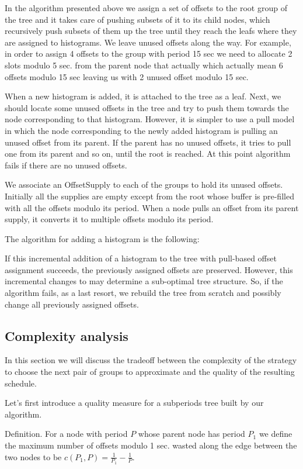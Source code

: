 In the algorithm presented above we assign a set of offsets to the root group of the tree and it takes care of pushing subsets of it to its child nodes, which recursively push subsets of them up the tree until they reach the leafs where they are assigned to histograms. We leave unused offsets along the way. For example, in order to assign 4 offsets to the group with period 15 sec we need to allocate 2 slots modulo 5 sec. from the parent node that actually which actually mean 6 offsets modulo 15 sec leaving us with 2 unused offset modulo 15 sec.

When a new histogram is added, it is attached to the tree as a leaf. Next, we should locate some unused offsets in the tree and try to push them towards the node corresponding to that histogram. However, it is simpler to use a pull model in which the node corresponding to the newly added histogram is pulling an unused offset from its parent. If the parent has no unused offsets, it tries to pull one from its parent and so on, until the root is reached. At this point algorithm fails if there are no unused offsets.

We associate an OffsetSupply to each of the groups to hold its unused offsets. Initially all the supplies are empty except from the root whose buffer is pre-filled with all the offsets modulo its period. When a node pulls an offset from its parent supply, it converts it to multiple offsets modulo its period.

The algorithm for adding a histogram is the following:

If this incremental addition of a histogram to the tree with pull-based offset assignment succeeds, the previously assigned offsets are preserved. However, this incremental changes to may determine a sub-optimal tree structure. So, if the algorithm fails, as a last resort, we rebuild the tree from scratch and possibly change all previously assigned offsets.

\subsection*{Complexity analysis}

In this section we will discuss the tradeoff between the complexity of the strategy to choose the next pair of groups to approximate and the quality of the resulting schedule.

Let’s first introduce a quality measure for a subperiods tree built by our algorithm. 

\begin{definition}
Definition. For a node with period $P$ whose parent node has period $P_1$ we define the maximum number of offsets modulo 1 sec. wasted along the edge between the two nodes to be $c(P_1,P)=\frac{1}{P_1}-\frac 1 P$.
\end{definition}

